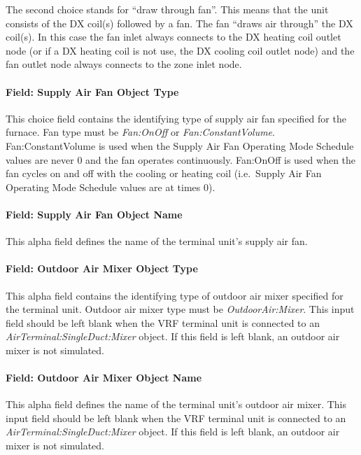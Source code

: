 The second choice stands for ``draw through fan''. This means that the unit consists of the DX coil(s) followed by a fan. The fan ``draws air through'' the DX coil(s). In this case the fan inlet always connects to the DX heating coil outlet node (or if a DX heating coil is not use, the DX cooling coil outlet node) and the fan outlet node always connects to the zone inlet node.

\paragraph{Field: Supply Air Fan Object Type}\label{field-supply-air-fan-object-type-8}

This choice field contains the identifying type of supply air fan specified for the furnace. Fan type must be \textit{Fan:OnOff} or \textit{Fan:ConstantVolume}. Fan:ConstantVolume is used when the Supply Air Fan Operating Mode Schedule values are never 0 and the fan operates continuously. Fan:OnOff is used when the fan cycles on and off with the cooling or heating coil (i.e.~Supply Air Fan Operating Mode Schedule values are at times 0).

\paragraph{Field: Supply Air Fan Object Name}\label{field-supply-air-fan-object-name}

This alpha field defines the name of the terminal unit's supply air fan.

\paragraph{Field: Outdoor Air Mixer Object Type}\label{field-outdoor-air-mixer-object-type}

This alpha field contains the identifying type of outdoor air mixer specified for the terminal unit. Outdoor air mixer type must be \textit{OutdoorAir:Mixer}. This input field should be left blank when the VRF terminal unit is connected to an \textit{AirTerminal:SingleDuct:Mixer} object. If this field is left blank, an outdoor air mixer is not simulated.

\paragraph{Field: Outdoor Air Mixer Object Name}\label{field-outdoor-air-mixer-object-name}

This alpha field defines the name of the terminal unit's outdoor air mixer. This input field should be left blank when the VRF terminal unit is connected to an \textit{AirTerminal:SingleDuct:Mixer} object. If this field is left blank, an outdoor air mixer is not simulated.

